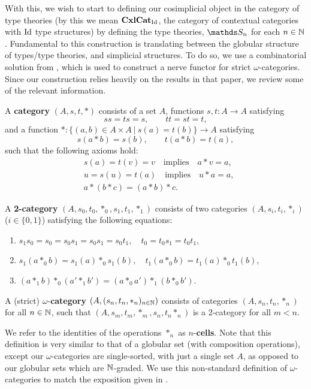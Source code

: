 \documentclass{article}
\begin{document}
With this, we wish to start to defining our cosimplicial object in the category of type theories (by this we mean $\operatorname{\mathbf{CxlCat}}_{\operatorname{Id}}$, the category of contextual categories with $\operatorname{Id}$ type structures) by defining the type theories, $\bS_n$ for each $n\in\mathbb{N}$. Fundamental to this construction is translating between the globular structure of types/type theories, and simplicial structures. To do so, we use a combinatorial solution from \cite{Street}, which is used to construct a nerve functor for strict $\omega$-categories. Since our construction relies heavily on the results in that paper, we review some of the relevant information.

\begin{defn}
    A \textbf{category} $(A,s,t,*)$ consists of a set $A$, functions $s,t\colon A\to A$ satisfying 
    $$ ss=ts=s,\qquad tt=st=t, $$
    and a function $*:\{(a,b)\in A\times A\ |\ s(a)=t(b)\}\to A$ satisfying
    $$ s(a*b)=s(b),\qquad t(a*b)=t(a), $$
    such that the following axioms hold:
    \begin{align*}
        &s(a)=t(v)=v\quad\text{implies}\quad a*v=a,\\
        &u=s(u)=t(a)\quad\text{implies}\quad u*a=a,\\
        &a*(b*c)=(a*b)*c.
    \end{align*}
\end{defn}

\begin{defn}
    A \textbf{2-category} $(A,s_0,t_0,*_0,s_1,t_1,*_1)$ consists of two categories $(A,s_i,t_i,*_i)$ ($i\in\{0,1\}$) satisfying the following equations:
    \begin{enumerate}
        \item $s_1s_0=s_0=s_0s_1=s_0s_1=s_0t_1,\quad t_0=t_0s_1=t_0t_1,$
        \item $s_1(a*_0b)=s_1(a)*_0s_1(b),\quad t_1(a*_0b)=t_1(a)*_0t_1(b),$
        \item $(a*_1 b)*_0(a'*_1b')=(a*_0a')*_1(b*_0b').$
    \end{enumerate}
\end{defn}

\begin{defn}
    A (strict) $\omega$-\textbf{category} $(A,(s_n,t_n,*_n)_{n\in\mathbb{N}})$ consists of categories $(A,s_n,t_n,*_n)$ for all $n\in\mathbb{N}$, such that $(A,s_m,t_m,*_m,s_n,t_n*_n)$ is a 2-category for all $m<n$.
\end{defn}

We refer to the identities of the operations $*_n$ as $n$-\textbf{cells}. Note that this definition is very similar to that of a globular set (with composition operations), except our $\omega$-categories are single-sorted, with just a single set $A$, as opposed to our globular sets which are $\mathbb{N}$-graded. We use this non-standard definition of $\omega$-categories to match the exposition given in \cite{Street}.
\end{document}
